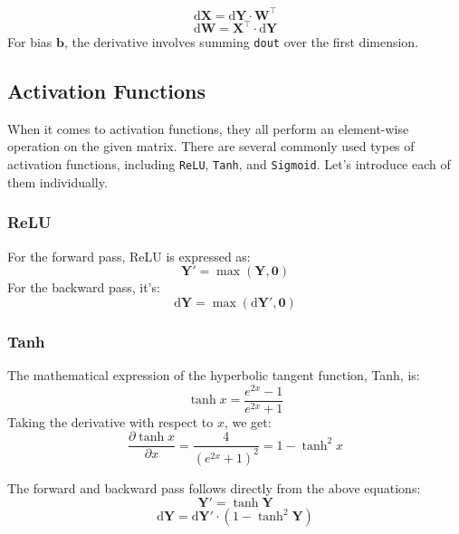 \documentclass[10pt,a4paper,twoside]{tau}
\renewcommand{\vec}[1]{\mathbf{#1}}
\renewcommand{\d}{\text{d}}
\begin{document}
\begin{equation}
    \d\vec{X} = \d\vec{Y} \cdot \vec{W}^{\top} \tag{3.1.2}
\end{equation}
\begin{equation}
    \d\vec{W} = \vec{X}^{\top} \cdot \d\vec{Y} \tag{3.1.3}
\end{equation}
For bias $\vec{b}$, the derivative involves summing \texttt{dout} over the first dimension. 


\subsection{Activation Functions}

When it comes to activation functions, they all perform an element-wise operation on the given matrix. There are several commonly used types of activation functions, including \texttt{ReLU}, \texttt{Tanh}, and \texttt{Sigmoid}. Let's introduce each of them individually.

\subsubsection{ReLU}

For the forward pass, ReLU is expressed as:
\begin{equation}
\vec{Y'} = \max(\vec{Y}, \vec{0}) \tag{3.2.1}
\end{equation}
For the backward pass, it's:
\begin{equation}
\d\vec{Y} = \max(\d\vec{Y'}, \vec{0}) \tag{3.2.2}
\end{equation}

\subsubsection{Tanh}

The mathematical expression of the hyperbolic tangent function, Tanh, is:
\begin{equation}
\tanh{x} = \frac{e^{2x} - 1}{e^{2x} + 1} \tag{3.2.3}
\end{equation}
Taking the derivative with respect to $x$, we get:
\begin{equation}
\frac{\partial \tanh{x}}{\partial x} = \frac{4}{(e^{2x}+1)^2} = 1 - \tanh^2{x} \tag{3.2.4}
\end{equation}

The forward and backward pass follows directly from the above equations:
\begin{equation}
\vec{Y'} = \tanh{\vec{Y}} \tag{3.2.5}
\end{equation}
\begin{equation}
\d\vec{Y} = \d\vec{Y'}\cdot(1 - \tanh^2\vec{Y}) \tag{3.2.6}
\end{equation}
\end{document}
